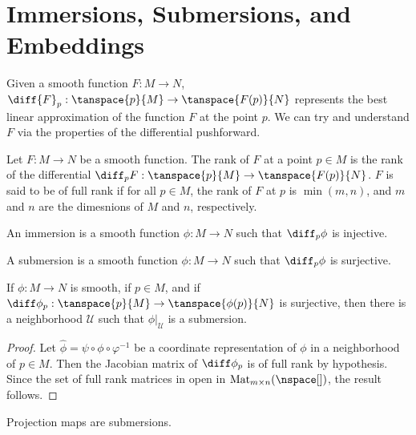 \documentclass{article}                                                        %
\begin{document}
    \section{Immersions, Submersions, and Embeddings}
        Given a smooth function $F:M\rightarrow{N}$,
        $\diff{F}_{p}:\tanspace{p}{M}\rightarrow\tanspace{F(p)}{N}$ represents
        the best linear approximation of the function $F$ at the point $p$. We
        can try and understand $F$ via the properties of the differential
        pushforward.
        \begin{definition}
            Let $F:M\rightarrow{N}$ be a smooth function. The rank of $F$ at a
            point $p\in{M}$ is the rank of the differential
            $\diff_{p}F:\tanspace{p}{M}\rightarrow\tanspace{F(p)}{N}$. $F$ is
            said to be of full rank if for all $p\in{M}$, the rank of $F$ at $p$
            is $\min(m,n)$, and $m$ and $n$ are the dimesnions of $M$ and
            $n$, respectively.
        \end{definition}
        \begin{definition}
            An immersion is a smooth function $\phi:M\rightarrow{N}$ such that
            $\diff_{p}\phi$ is injective.
        \end{definition}
        \begin{definition}
            A submersion is a smooth function $\phi:M\rightarrow{N}$ such that
            $\diff_{p}\phi$ is surjective.
        \end{definition}
        \begin{theorem}
            If $\phi:M\rightarrow{N}$ is smooth, if $p\in{M}$, and if
            $\diff\phi_{p}:\tanspace{p}{M}\rightarrow\tanspace{\phi(p)}{N}$ is
            surjective, then there is a neighborhood $\mathcal{U}$ such that
            $\phi|_{\mathcal{U}}$ is a submersion.
        \end{theorem}
        \begin{proof}
            Let $\hat{\phi}=\psi\circ\phi\circ\varphi^{\minus{1}}$ be a
            coordinate representation of $\phi$ in a neighborhood of $p\in{M}$.
            Then the Jacobian matrix of $\diff\phi_{p}$ is of full rank by
            hypothesis. Since the set of full rank matrices in open in
            $\textrm{Mat}_{m\times{n}}(\nspace[])$, the result follows.
        \end{proof}
        \begin{example}
            Projection maps are submersions.
        \end{example}
\end{document}
